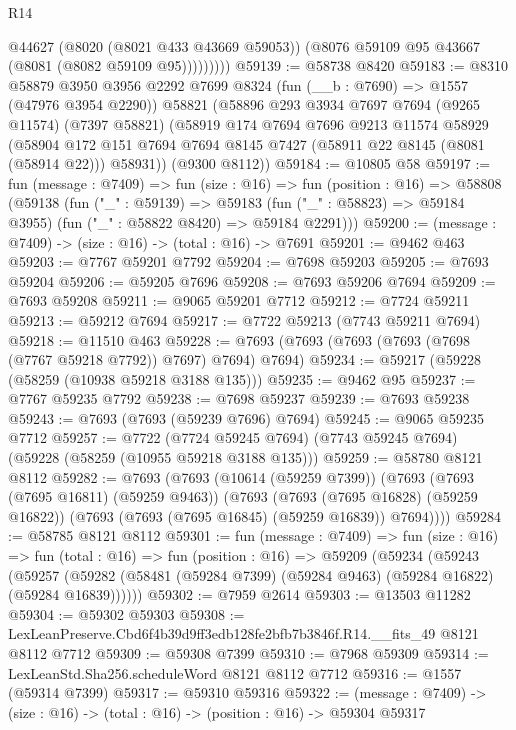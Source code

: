 \begin{lexlean}{R14}
\begin{coremodule}
                @44627
                (@8020 (@8021 @433 @43669 @59053))
                (@8076 @59109 @95 @43667 (@8081 (@8082 @59109 @95)))))))))
@59139 := @58738 @8420
@59183 := @8310
    @58879
    @3950
    @3956
    @2292
    @7699
    @8324
    (fun (__b : @7690) => @1557 (@47976 @3954 @2290))
    @58821
    (@58896
      @293
      @3934
      @7697
      @7694
      (@9265 @11574)
      (@7397 @58821)
      (@58919
        @174
        @7694
        @7696
        @9213
        @11574
        @58929
        (@58904 @172 @151 @7694 @7694 @8145 @7427 (@58911 @22 @8145 (@8081 (@58914 @22))) @58931))
      (@9300 @8112))
@59184 := @10805 @58
@59197 := fun (message : @7409) =>
  fun (size : @16) =>
  fun (position : @16) =>
  @58808
    (@59138
      (fun ("_" : @59139) =>
      @59183 (fun ("_" : @58823) => @59184 @3955) (fun ("_" : @58822 @8420) => @59184 @2291)))
@59200 := (message : @7409) -> (size : @16) -> (total : @16) -> @7691
@59201 := @9462 @463
@59203 := @7767 @59201 @7792
@59204 := @7698 @59203
@59205 := @7693 @59204
@59206 := @59205 @7696
@59208 := @7693 @59206 @7694
@59209 := @7693 @59208
@59211 := @9065 @59201 @7712
@59212 := @7724 @59211
@59213 := @59212 @7694
@59217 := @7722 @59213 (@7743 @59211 @7694)
@59218 := @11510 @463
@59228 := @7693 (@7693 (@7693 (@7693 (@7698 (@7767 @59218 @7792)) @7697) @7694) @7694)
@59234 := @59217 (@59228 (@58259 (@10938 @59218 @3188 @135)))
@59235 := @9462 @95
@59237 := @7767 @59235 @7792
@59238 := @7698 @59237
@59239 := @7693 @59238
@59243 := @7693 (@7693 (@59239 @7696) @7694)
@59245 := @9065 @59235 @7712
@59257 := @7722
    (@7724 @59245 @7694)
    (@7743 @59245 @7694)
    (@59228 (@58259 (@10955 @59218 @3188 @135)))
@59259 := @58780 @8121 @8112
@59282 := @7693
    (@7693
      (@10614 (@59259 @7399))
      (@7693
        (@7693 (@7695 @16811) (@59259 @9463))
        (@7693
          (@7693 (@7695 @16828) (@59259 @16822))
          (@7693 (@7693 (@7695 @16845) (@59259 @16839)) @7694))))
@59284 := @58785 @8121 @8112
@59301 := fun (message : @7409) =>
  fun (size : @16) =>
  fun (total : @16) =>
  fun (position : @16) =>
  @59209
    (@59234
      (@59243
        (@59257 (@59282 (@58481 (@59284 @7399) (@59284 @9463) (@59284 @16822) (@59284 @16839))))))
@59302 := @7959 @2614
@59303 := @13503 @11282
@59304 := @59302 @59303
@59308 := LexLeanPreserve.Cbd6f4b39d9ff3edb128fe2bfb7b3846f.R14.__fits_49 @8121 @8112 @7712
@59309 := @59308 @7399
@59310 := @7968 @59309
@59314 := LexLeanStd.Sha256.scheduleWord @8121 @8112 @7712
@59316 := @1557 (@59314 @7399)
@59317 := @59310 @59316
@59322 := (message : @7409) -> (size : @16) -> (total : @16) -> (position : @16) -> @59304 @59317

\end{coremodule}
\end{lexlean}
